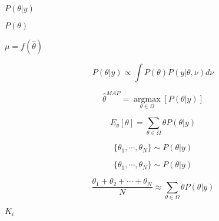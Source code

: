 \documentclass[10pt]{book}
\begin{document}
\begin{mdSnippets}
\begin{mdInlineSnippet}[0d3b80c3bdc7376c743b859592f0f512]%
{$P(\theta|y)$}\end{mdInlineSnippet}%
\begin{mdInlineSnippet}[819c788ca13bd51018a48b2e18de6e8a]%
{$P(\theta)$}\end{mdInlineSnippet}%
\begin{mdInlineSnippet}[ef159b62ac10a529251038146334868f]%
{$\mu = f(\hat{\theta})$}\end{mdInlineSnippet}%
\begin{mdDisplaySnippet}%
\[%
P(\theta|y) \propto \int P(\theta) P(y|\theta, \nu) d\nu
\]%
\end{mdDisplaySnippet}%
\begin{mdDisplaySnippet}[bb1002215e6634b163272b3a4de3a42d]%
\[%
\hat \theta^{MAP}  = \underset{\theta \in \Omega}{\operatorname{arg max}} \left [ P(\theta|y) \right ]
\]%
\end{mdDisplaySnippet}%
\begin{mdDisplaySnippet}%
\[%
E_y[\theta]  = \sum_{\theta \in \Omega} \theta P(\theta|y) 
\]%
\end{mdDisplaySnippet}%
\begin{mdDisplaySnippet}[135f4d59f27274e3d40c131b47fadf4b]%
\[%
\{\theta_1, \cdots, \theta_N\} \sim P(\theta|y)
\]%
\end{mdDisplaySnippet}%
\begin{mdDisplaySnippet}[b88588792619c2f486c7806fbac33d28]%
\[%
    \{\theta_1, \cdots, \theta_N\} \sim P(\theta|y)
\]%
\end{mdDisplaySnippet}%
\begin{mdDisplaySnippet}[4633a2b8b766449de63bc35fda29e66f]%
\[%
     \frac{\theta_1 + \theta_2 + \cdots + \theta_N}{N} \approx \sum_{\theta \in \Omega} \theta P(\theta|y) 
\]%
\end{mdDisplaySnippet}%
\begin{mdInlineSnippet}[201400d073866463c42632818d600ec1]%
{$K_i$}\end{mdInlineSnippet}%

\end{mdSnippets}
\end{document}
